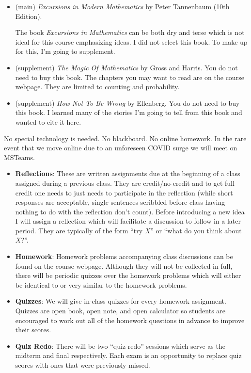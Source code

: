 \documentclass[11pt, letterpaper]{article}
\theoremstyle{definition}
\theoremstyle{remark}
\begin{document}
\begin{itemize}
\item (main) {\it Excursions in Modern Mathematics} by Peter Tannenbaum (10th Edition).

The book \emph{Excursions in Mathematics} can be both dry and terse which is not ideal for this course emphasizing ideas. 
I did not select this book. 
To make up for this, I'm going to supplement.

\item (supplement) \emph{The Magic Of Mathematics} by Gross and Harris. 
You do not need to buy this book. The chapters you may want to read are on the course webpage. They are limited to counting and probability.

\item (supplement) \emph{How Not To Be Wrong} by Ellenberg. 
You do not need to buy this book. I learned many of the stories I'm going to tell from this book and wanted to cite it here.
\end{itemize}



\vspace{1em}


 No special technology is needed. 
No blackboard. 
No online homework. 
In the rare event that we move online due to an unforeseen COVID surge we will meet on MSTeams.
\vspace{1em}




\begin{itemize}
	\item {\bf Reflections}: These are written assignments due at the beginning of a class assigned during a previous class. 
	They are credit/no-credit and to get full credit one needs to just needs to participate in the reflection (while short responses are acceptable, single sentences scribbled before class having nothing to do with the reflection don't count). 
	Before introducing a new idea I will assign a reflection which will facilitate a discussion to follow in a later period. 
	They are typically of the form ``try $X$'' or ``what do you think about $X$?''.
	\item {\bf Homework}: Homework problems accompanying class discussions can be found on the course webpage. Although they will not be collected in full, there will be periodic quizzes over the homework problems which will either be identical to or very similar to the homework problems.
	\item {\bf Quizzes}: We will give in-class quizzes for every homework assignment. Quizzes are open book, open note, and open calculator so students are encouraged to work out all of the homework questions in advance to improve their scores.
	\item {\bf Quiz Redo}: There will be two ``quiz redo'' sessions which serve as the midterm and final respectively. 
	Each exam is an opportunity to replace quiz scores with ones that were previously missed.
\end{itemize}
\end{document}
